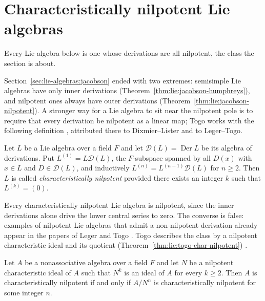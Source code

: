 \section{Characteristically nilpotent Lie algebras}\label{sec:lie-algebras:characteristically-nilpotent}

Every Lie algebra below is one whose derivations are all nilpotent, the class the section is about.

Section~\ref{sec:lie-algebras:jacobson} ended with two extremes:
semisimple Lie algebras have only inner derivations
(Theorem~\ref{thm:lie:jacobson-humphreys}), and nilpotent ones always have
outer derivations (Theorem~\ref{thm:lie:jacobson-nilpotent}).  A stronger
way for a Lie algebra to sit near the nilpotent pole is to require that
every derivation be nilpotent as a linear map; Togo works with the
following definition \cite[p.~209]{Togo1969}, attributed there to
Dixmier--Lister and to Leger--Togo.

\begin{definition}\label{def:lie:char-nilpotent}
Let $L$ be a Lie algebra over a field $F$ and let
$\mathcal{D}(L)=\operatorname{Der} L$ be its algebra of derivations.  Put
$L^{(1)}=L\mathcal{D}(L)$, the $F$-subspace spanned by all $D(x)$ with
$x\in L$ and $D\in\mathcal{D}(L)$, and inductively
$L^{(n)}=L^{(n-1)}\mathcal{D}(L)$ for $n\geq 2$.  Then $L$ is called
\emph{characteristically nilpotent} provided there exists an integer $k$
such that $L^{(k)}=(0)$.
\end{definition}

Every characteristically nilpotent Lie algebra is nilpotent, since the inner
derivations alone drive the lower central series to zero.  The converse is
false: examples of nilpotent Lie algebras that admit a non-nilpotent
derivation already appear in the papers of Leger and Togo
\cite[p.~209]{Togo1969}.  Togo describes the class by a nilpotent
characteristic ideal and its quotient (Theorem~\ref{thm:lie:togo-char-nilpotent})
\cite[Theorem, p.~210]{Togo1969}.\begin{theorem}\label{thm:lie:togo-char-nilpotent}
Let $A$ be a nonassociative algebra over a field $F$ and let $N$ be a
nilpotent characteristic ideal of $A$ such that $N^{k}$ is an ideal of $A$
for every $k\geq 2$.  Then $A$ is characteristically nilpotent if and only
if $A/N^{n}$ is characteristically nilpotent for some integer $n$.
\end{theorem}

